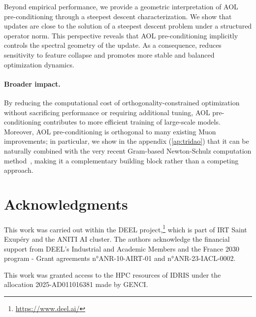 Beyond empirical performance, we provide a geometric interpretation of AOL pre-conditioning through a steepest descent characterization. We show that \turbomuon updates are close to the solution of a steepest descent problem under a structured operator norm. This perspective reveals that AOL pre-conditioning implicitly controls the spectral geometry of the update. As a consequence, \turbomuon reduces sensitivity to feature collapse and promotes more stable and balanced optimization dynamics.

\paragraph{Broader impact.}
By reducing the computational cost of orthogonality-constrained optimization without sacrificing performance or requiring additional tuning, AOL pre-conditioning contributes to more efficient training of large-scale models. Moreover, AOL pre-conditioning is orthogonal to many existing Muon improvements; in particular, we show in the appendix (\cref{ap:tridao}) that it can be naturally combined with the very recent Gram-based Newton-Schulz computation method~\cite{GramNewtonSchulz}, making it a complementary building block rather than a competing approach.


\ifarxiv

\section*{Acknowledgments}

This work was carried out within the DEEL project,\footnote{\url{https://www.deel.ai/}} which is part of IRT Saint Exupéry and the ANITI AI cluster. The authors acknowledge the financial support from DEEL's Industrial and Academic Members and the France 2030 program - Grant agreements n°ANR-10-AIRT-01 and n°ANR-23-IACL-0002.

\noindent This work was granted access to the HPC resources of IDRIS under the allocation 2025-AD011016381 made by GENCI. 
\fi

{\small


}

\onecolumn
\appendix
\clearpage \appendix 





